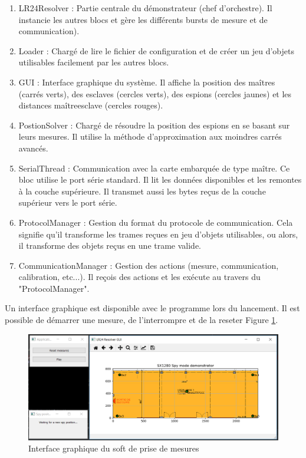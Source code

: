 \begin{enumerate}
	\item LR24Resolver : Partie centrale du démonstrateur (chef d’orchestre). Il instancie les autres blocs et gère les différents bursts de mesure et de communication).
	\item Loader : Chargé de lire le fichier de configuration et de créer un jeu d’objets utilisables facilement par les autres blocs.
	\item GUI : Interface graphique du système. Il affiche la position des maîtres (carrés verts), des esclaves (cercles verts), des espions (cercles jaunes) et les distances maîtreesclave (cercles rouges).
	\item PostionSolver : Chargé de résoudre la position des espions en se basant sur leurs mesures. Il utilise la méthode d’approximation aux moindres carrés avancés.
	\item SerialThread : Communication avec la carte embarquée de type maître. Ce bloc utilise le port série standard. Il lit les données disponibles et les remontes à la couche supérieure. Il transmet aussi les bytes reçus de la couche supérieur vers le port série.
	\item ProtocolManager : Gestion du format du protocole de communication. Cela signifie qu’il transforme les trames reçues en jeu d’objets utilisables, ou alors, il transforme des objets reçus en une trame valide.
	\item CommunicationManager : Gestion des actions (mesure, communication, calibration, etc...). Il reçois des actions et les exécute au travers du "ProtocolManager".
\end{enumerate}

Un interface graphique est disponible avec le programme lors du lancement. Il est possible de démarrer une mesure, de l'interrompre et de la reseter Figure \ref{fig:GUI_LR24}.

\begin{figure}[htp]
	\begin{center}
		\includegraphics[scale=0.7]{figures/LR24_GUI.png}
		\caption{Interface graphique du soft de prise de mesures}
		\label{fig:GUI_LR24} %
	\end{center}
\end{figure}

